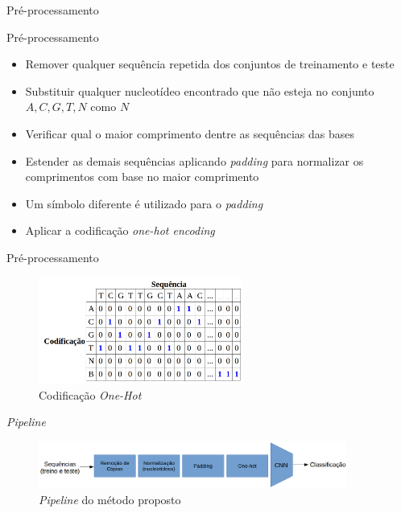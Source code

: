 \documentclass[%
  xcolor=table,%
  10pt,%
  aspectratio = 169,%
  compress,%
  t,%
]{beamer}%
\begin{document}
\begin{frame}{}{Pré-processamento}
    \begin{block}{Pré-processamento}
        \begin{itemize}
            \item Remover qualquer sequência repetida dos conjuntos de treinamento e teste
            \item Substituir qualquer nucleotídeo encontrado que não esteja no conjunto ${A,C,G,T,N}$ como $N$
            \item Verificar qual o maior comprimento dentre as sequências das bases
            \item Estender as demais sequências aplicando \textit{padding} para normalizar os comprimentos com base no maior comprimento
            \item Um símbolo diferente é utilizado para o \textit{padding}
            \item Aplicar a codificação \textit{one-hot encoding}
        \end{itemize}
    \end{block}
\end{frame}

\begin{frame}{}{Pré-processamento}
    \begin{figure}
        \centering
        \includegraphics[width=0.6\textwidth]{./Figuras/one-hot-pt.png}
        \caption{Codificação \textit{One-Hot}}
        \label{fig:one-hot}
    \end{figure}
\end{frame}

\begin{frame}{}{\textit{Pipeline}}
    \begin{figure}
        \centering
        \includegraphics[width=0.9\textwidth]{./Figuras/pipeline.png}
        \caption{\textit{Pipeline} do método proposto}
        \label{fig:pipeline}
    \end{figure}
\end{frame}
\end{document}
